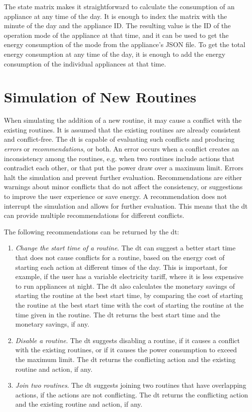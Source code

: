 The state matrix makes it straightforward to calculate the consumption of an appliance at any time of the day. It is enough to index the matrix with the minute of the day and the appliance ID. The resulting value is the ID of the operation mode of the appliance at that time, and it can be used to get the energy consumption of the mode from the appliance's JSON file. To get the total energy consumption at any time of the day, it is enough to add the energy consumption of the individual appliances at that time.

\section{Simulation of New Routines}\label{sec:simulation}

When simulating the addition of a new routine, it may cause a conflict with the existing routines. It is assumed that the existing routines are already consistent and conflict-free. The \acrshort{dt} is capable of evaluating such conflicts and producing \textit{errors} or \textit{recommendations}, or both. An error occurs when a conflict creates an inconsistency among the routines, e.g. when two routines include actions that contradict each other, or that put the power draw over a maximum limit. Errors halt the simulation and prevent further evaluation. Recommendations are either warnings about minor conflicts that do not affect the consistency, or suggestions to improve the user experience or save energy. A recommendation does not interrupt the simulation and allows for further evaluation. This means that the \acrshort{dt} can provide multiple recommendations for different conflicts.

The following recommendations can be returned by the \acrshort{dt}:
\begin{enumerate}[label={R\arabic*.}, leftmargin=3.5em]
    \item \textit{Change the start time of a routine}. The \acrshort{dt} can suggest a better start time that does not cause conflicts for a routine, based on the energy cost of starting each action at different times of the day. This is important, for example, if the user has a variable electricity tariff, where it is less expensive to run appliances at night. The \acrshort{dt} also calculates the monetary savings of starting the routine at the best start time, by comparing the cost of starting the routine at the best start time with the cost of starting the routine at the time given in the routine. The \acrshort{dt} returns the best start time and the monetary savings, if any.
    \item \textit{Disable a routine}. The \acrshort{dt} suggests disabling a routine, if it causes a conflict with the existing routines, or if it causes the power consumption to exceed the maximum limit. The \acrshort{dt} returns the conflicting action and the existing routine and action, if any.
    \item \textit{Join two routines}. The \acrshort{dt} suggests joining two routines that have overlapping actions, if the actions are not conflicting. The \acrshort{dt} returns the conflicting action and the existing routine and action, if any.
\end{enumerate}

